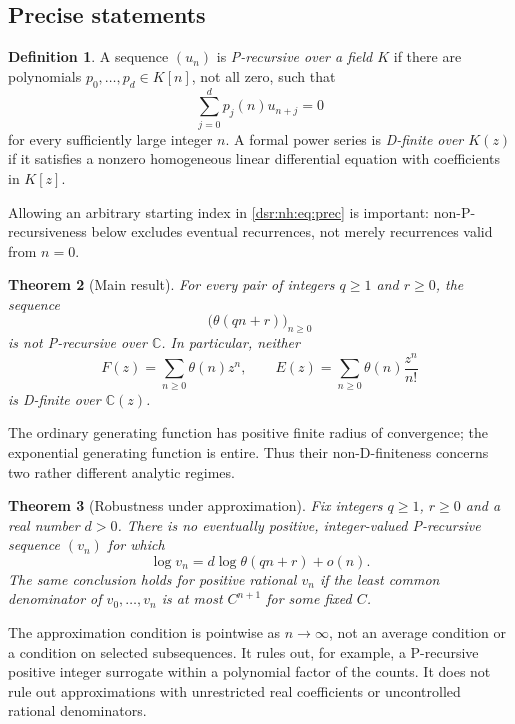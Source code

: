 \documentclass[11pt,a4paper]{article}
\numberwithin{equation}{section}
\newtheorem{theorem}{Theorem}[section]
\theoremstyle{definition}
\newtheorem{definition}[theorem]{Definition}
\theoremstyle{remark}
\newcommand{\C}{\mathbb C}
\newcommand{\tht}{\theta}
\theoremstyle{definition}
\theoremstyle{plain}
\begin{document}
\subsection{Precise statements}
\begin{definition}
A sequence $(u_n)$ is \emph{P-recursive over a field $K$} if there are
polynomials $p_0,\ldots,p_d\in K[n]$, not all zero, such that
\begin{equation}
\sum_{j=0}^{d}p_j(n)u_{n+j}=0
\label{dsr:nh:eq:prec}
\end{equation}
for every sufficiently large integer $n$. A formal power series is
\emph{D-finite over $K(z)$} if it satisfies a nonzero homogeneous linear
differential equation with coefficients in $K[z]$.
\end{definition}
Allowing an arbitrary starting index in \eqref{dsr:nh:eq:prec} is important:
non-P-recursiveness below excludes eventual recurrences, not merely
recurrences valid from $n=0$.

\begin{theorem}[Main result]
\label{dsr:nh:thm:main}
For every pair of integers $q\ge1$ and $r\ge0$, the sequence
\[
\bigl(\tht(qn+r)\bigr)_{n\ge0}
\]
is not P-recursive over $\C$. In particular, neither
\begin{equation}
F(z)=\sum_{n\ge0}\tht(n)z^n,
\qquad
E(z)=\sum_{n\ge0}\tht(n)\frac{z^n}{n!}
\label{dsr:nh:eq:generating}
\end{equation}
is D-finite over $\C(z)$.
\end{theorem}
The ordinary generating function has positive finite radius of convergence;
the exponential generating function is entire. Thus their non-D-finiteness
concerns two rather different analytic regimes.

\begin{theorem}[Robustness under approximation]
\label{dsr:nh:thm:robustintro}
Fix integers $q\ge1$, $r\ge0$ and a real number $d>0$.
There is no eventually positive, integer-valued P-recursive sequence $(v_n)$
for which
\begin{equation}
\log v_n=d\log\tht(qn+r)+o(n).
\label{dsr:nh:eq:proxy}
\end{equation}
The same conclusion holds for positive rational $v_n$ if the least common
denominator of $v_0,\ldots,v_n$ is at most $C^{n+1}$ for some fixed $C$.
\end{theorem}
The approximation condition is pointwise as $n\to\infty$, not an average
condition or a condition on selected subsequences. It rules out, for example,
a P-recursive positive integer surrogate within a polynomial factor of the
counts. It does not rule out approximations with unrestricted real
coefficients or uncontrolled rational denominators.
\end{document}
